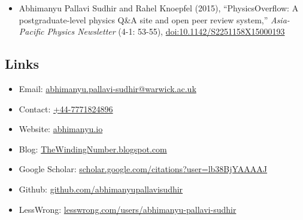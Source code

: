 \documentclass{article}
\begin{document}
\begin{itemize}

    \item
          Abhimanyu Pallavi Sudhir and Rahel Knoepfel (2015),
          ``PhysicsOverflow: A postgraduate-level physics Q\&A site and open peer review system,''
          \emph{Asia-Pacific Physics Newsletter} (4-1: 53-55),
          \href{https://dx.doi.org/10.1142/S2251158X15000193}{doi:10.1142/S2251158X15000193}

\end{itemize}


\subsection*{Links}

\begin{itemize}
    \item Email: \href{mailto:abhimanyu.pallavi-sudhir@warwick.ac.uk}{abhimanyu.pallavi-sudhir@warwick.ac.uk}
    \item Contact: \href{tel:+44-7771824896}{+44-7771824896}
    \item Website: \href{https://abhimanyu.io/}{abhimanyu.io}
    \item Blog: \href{https://thewindingnumber.blogspot.com/}{TheWindingNumber.blogspot.com}
    \item Google Scholar: \href{https://scholar.google.com/citations?user=lb38BjYAAAAJ&hl=en}{scholar.google.com/citations?user=lb38BjYAAAAJ}
    \item Github: \href{https://github.com/abhimanyupallavisudhir}{github.com/abhimanyupallavisudhir}
    \item LessWrong: \href{https://www.lesswrong.com/users/abhimanyu-pallavi-sudhir}{lesswrong.com/users/abhimanyu-pallavi-sudhir}
\end{itemize}
\end{document}
